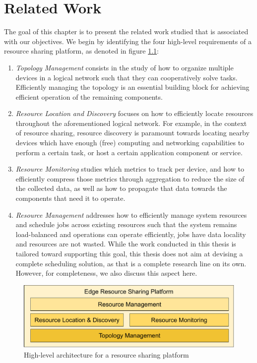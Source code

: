 \chapter{Related Work} 
\label{cha:related_work}

The goal of this chapter is to present the related work studied that is associated with our objectives. We begin by identifying the four high-level requirements of a resource sharing platform, as denoted in figure \ref{fig:proposed_architecture}:

\begin{enumerate}

    \item \textit{Topology Management} consists in the study of how to organize multiple devices in a logical network such that they can cooperatively solve tasks. Efficiently managing the topology is an essential building block for achieving efficient operation of the remaining components. 
    
    \item \textit{Resource Location and Discovery} focuses on how to efficiently locate resources throughout the aforementioned logical network. For example, in the context of resource sharing, resource discovery is paramount towards locating nearby devices which have enough (free) computing and networking capabilities to perform a certain task, or host a certain application component or service.
    
    \item \textit{Resource Monitoring} studies which metrics to track per device, and how to efficiently compress those metrics through aggregation to reduce the size of the collected data, as well as how to propagate that data towards the components that need it to operate.

    \item \textit{Resource Management} addresses how to efficiently manage system resources and schedule jobs across existing resources such that the system remains load-balanced and operations can operate efficiently, jobs have data locality and resources are not wasted. While the work conducted in this thesis is tailored toward supporting this goal, this thesis does not aim at devising a complete scheduling solution, as that is a complete research line on its own. However, for completeness, we also discuss this aspect here.

\end{enumerate}

\begin{figure}
    \centering
    \includegraphics[width=0.55\linewidth]{Figures/proposed_architecture.pdf}
    \caption{High-level architecture for a resource sharing platform}
    \label{fig:proposed_architecture}
\end{figure}

